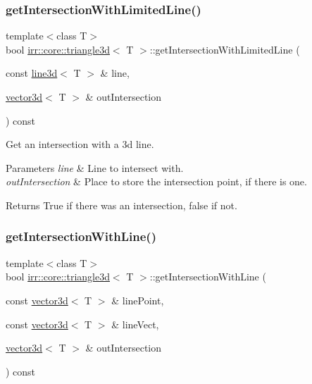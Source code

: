 \subsubsection{\texorpdfstring{get\+Intersection\+With\+Limited\+Line()}{getIntersectionWithLimitedLine()}}
{\footnotesize\ttfamily template$<$class T$>$ \\
bool \hyperlink{classirr_1_1core_1_1triangle3d}{irr\+::core\+::triangle3d}$<$ T $>$\+::get\+Intersection\+With\+Limited\+Line (\begin{DoxyParamCaption}\item[{const \hyperlink{classirr_1_1core_1_1line3d}{line3d}$<$ T $>$ \&}]{line,  }\item[{\hyperlink{classirr_1_1core_1_1vector3d}{vector3d}$<$ T $>$ \&}]{out\+Intersection }\end{DoxyParamCaption}) const\hspace{0.3cm}{\ttfamily [inline]}}



Get an intersection with a 3d line. 


\begin{DoxyParams}{Parameters}
{\em line} & Line to intersect with. \\
\hline
{\em out\+Intersection} & Place to store the intersection point, if there is one. \\
\hline
\end{DoxyParams}
\begin{DoxyReturn}{Returns}
True if there was an intersection, false if not. 
\end{DoxyReturn}
\mbox{\label{classirr_1_1core_1_1triangle3d_a70e0d27d17f9f0d14117df912cdaafe1}} 
\subsubsection{\texorpdfstring{get\+Intersection\+With\+Line()}{getIntersectionWithLine()}}
{\footnotesize\ttfamily template$<$class T$>$ \\
bool \hyperlink{classirr_1_1core_1_1triangle3d}{irr\+::core\+::triangle3d}$<$ T $>$\+::get\+Intersection\+With\+Line (\begin{DoxyParamCaption}\item[{const \hyperlink{classirr_1_1core_1_1vector3d}{vector3d}$<$ T $>$ \&}]{line\+Point,  }\item[{const \hyperlink{classirr_1_1core_1_1vector3d}{vector3d}$<$ T $>$ \&}]{line\+Vect,  }\item[{\hyperlink{classirr_1_1core_1_1vector3d}{vector3d}$<$ T $>$ \&}]{out\+Intersection }\end{DoxyParamCaption}) const\hspace{0.3cm}{\ttfamily [inline]}}



